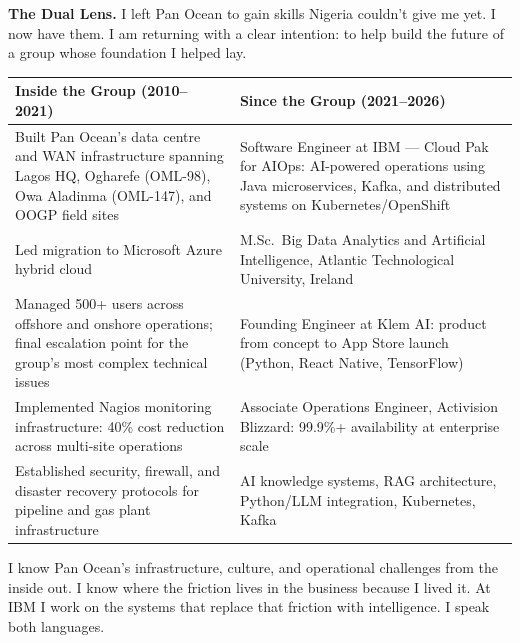 \documentclass[10pt]{article}
\begin{document}
\noindent\colorbox{primary!8}{%
\begin{minipage}{\dimexpr\textwidth-2\fboxsep}
  \vspace{5pt}
  \textbf{\color{primary}The Dual Lens.}\quad
  I left Pan Ocean to gain skills Nigeria couldn't give me yet. I now have them.
  I am returning with a clear intention: to help build the future of a group
  whose foundation I helped lay.
  \vspace{5pt}
\end{minipage}}

\vspace{6pt}

\small
\begin{tabularx}{\columnwidth}{@{}XX@{}}
\toprule
\textbf{Inside the Group (2010--2021)} & \textbf{Since the Group (2021--2026)} \\
\midrule
Built Pan Ocean's data centre and WAN infrastructure spanning Lagos HQ,
Ogharefe (OML-98), Owa Aladinma (OML-147), and OOGP field sites
  & Software Engineer at IBM --- Cloud Pak for AIOps: AI-powered operations
    using Java microservices, Kafka, and distributed systems on
    Kubernetes/OpenShift \\[4pt]
Led migration to Microsoft Azure hybrid cloud
  & M.Sc.\ Big Data Analytics and Artificial Intelligence,
    Atlantic Technological University, Ireland \\[4pt]
Managed 500+ users across offshore and onshore operations; final escalation
point for the group's most complex technical issues
  & Founding Engineer at Klem AI: product from concept to App Store launch
    (Python, React Native, TensorFlow) \\[4pt]
Implemented Nagios monitoring infrastructure: 40\% cost reduction across
multi-site operations
  & Associate Operations Engineer, Activision Blizzard: 99.9\%+ availability
    at enterprise scale \\[4pt]
Established security, firewall, and disaster recovery protocols for pipeline
and gas plant infrastructure
  & AI knowledge systems, RAG architecture, Python/LLM integration,
    Kubernetes, Kafka \\
\bottomrule
\end{tabularx}
\normalsize

\vspace{4pt}
I know Pan Ocean's infrastructure, culture, and operational challenges from the
inside out. I know where the friction lives in the business because I lived it.
At IBM I work on the systems that replace that friction with intelligence.
I speak both languages.
\end{document}
